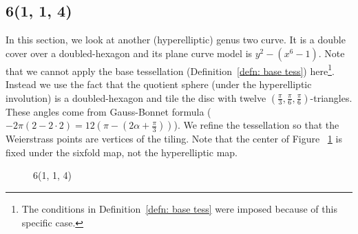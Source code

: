 \documentclass[12pt,reqno]{amsart}
\theoremstyle{definition}
\theoremstyle{remark}
\begin{document}
\subsection{6(1, 1, 4)}

In this section, we look at another (hyperelliptic) genus two curve. It is a double cover over a doubled-hexagon and its plane curve model is $y^2 - (x^6 - 1).$ Note that we cannot apply the base tessellation (Definition~\ref{defn: base tess}) here\footnote{The conditions in Definition~\ref{defn: base tess} were imposed because of this specific case.}. Instead we use the fact that the quotient sphere (under the hyperelliptic involution) is a doubled-hexagon and tile the disc with twelve $(\frac{\pi}{3}, \frac{\pi}{6}, \frac{\pi}{6})$-triangles. These angles come from Gauss-Bonnet formula ($-2 \pi (2 - 2 \cdot 2) = 12 (\pi - (2 \alpha + \frac{\pi}{3}))$). We refine the tessellation so that the Weierstrass points are vertices of the tiling. Note that the center of Figure~ \cref{fig:114} is fixed under the sixfold map, not the hyperelliptic map. 

\begin{figure}[htbp]
    \centering
    \qquad
    \caption{6(1, 1, 4)}%
    \label{fig:114}%
\end{figure}
\end{document}
